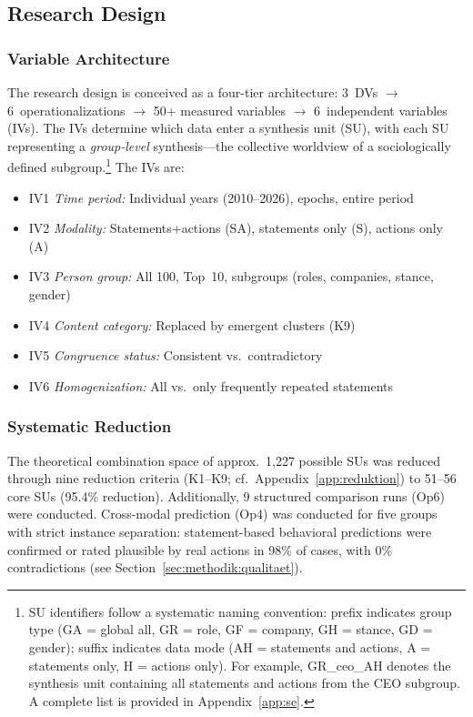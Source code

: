 \documentclass[12pt,a4paper]{article}
\begin{document}
\subsection{Research Design}
\label{sec:methodik:design}

\subsubsection{Variable Architecture}

The research design is conceived as a four-tier architecture: 3~DVs $\to$ 6~operationalizations $\to$ 50+ measured variables $\to$ 6~independent variables (IVs). The IVs determine which data enter a synthesis unit (SU), with each SU representing a \emph{group-level} synthesis---the collective worldview of a sociologically defined subgroup.\footnote{SU identifiers follow a systematic naming convention: prefix indicates group type (GA = global all, GR = role, GF = company, GH = stance, GD = gender); suffix indicates data mode (AH = statements and actions, A = statements only, H = actions only). For example, GR\_ceo\_AH denotes the synthesis unit containing all statements and actions from the CEO subgroup. A complete list is provided in Appendix~\ref{app:se}.} The IVs are:

\begin{itemize}[nosep]
  \item IV1 \emph{Time period:} Individual years (2010--2026), epochs, entire period
  \item IV2 \emph{Modality:} Statements+actions (SA), statements only (S), actions only (A)
  \item IV3 \emph{Person group:} All 100, Top~10, subgroups (roles, companies, stance, gender)
  \item IV4 \emph{Content category:} Replaced by emergent clusters (K9)
  \item IV5 \emph{Congruence status:} Consistent vs.\ contradictory
  \item IV6 \emph{Homogenization:} All vs.\ only frequently repeated statements
\end{itemize}

\subsubsection{Systematic Reduction}

The theoretical combination space of approx.\ 1,227 possible SUs was reduced through nine reduction criteria (K1--K9; cf.\ Appendix~\ref{app:reduktion}) to 51--56 core SUs (95.4\% reduction). Additionally, 9 structured comparison runs (Op6) were conducted. Cross-modal prediction (Op4) was conducted for five groups with strict instance separation: statement-based behavioral predictions were confirmed or rated plausible by real actions in 98\% of cases, with 0\% contradictions (see Section~\ref{sec:methodik:qualitaet}).
\end{document}
